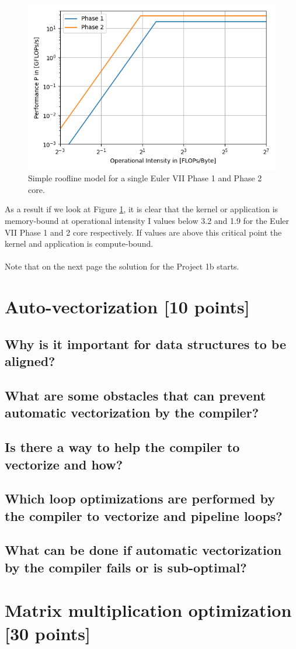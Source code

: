 \documentclass[unicode,11pt,a4paper,oneside,numbers=endperiod,openany]{scrartcl}
\begin{document}
\begin{figure}[H]
    \centering
    \includegraphics[width=\textwidth]{Images/performance.png}
    \caption{Simple roofline model for a single Euler VII Phase 1 and Phase 2 core.}
    \label{fig:performance}
\end{figure}
As a result if we look at Figure \ref{fig:performance}, it is clear that the kernel or application is memory-bound at 
operational intensity I values below 3.2 and 1.9 for the Euler VII Phase 1 and 2 core respectively. If values are above
this critical point the kernel and application is compute-bound. \\ \\
Note that on the next page the solution for the Project 1b starts.

\newpage
\section{Auto-vectorization [10 points]}

\subsection{Why is it important for data structures to be aligned?}

\subsection{What are some obstacles that can prevent automatic vectorization by the compiler?}

\subsection{Is there a way to help the compiler to vectorize and how?}

\subsection{Which loop optimizations are performed by the compiler to vectorize and pipeline loops?}

\subsection{What can be done if automatic vectorization by the compiler fails or is sub-optimal?}

\section{Matrix multiplication optimization [30 points]}
\end{document}
